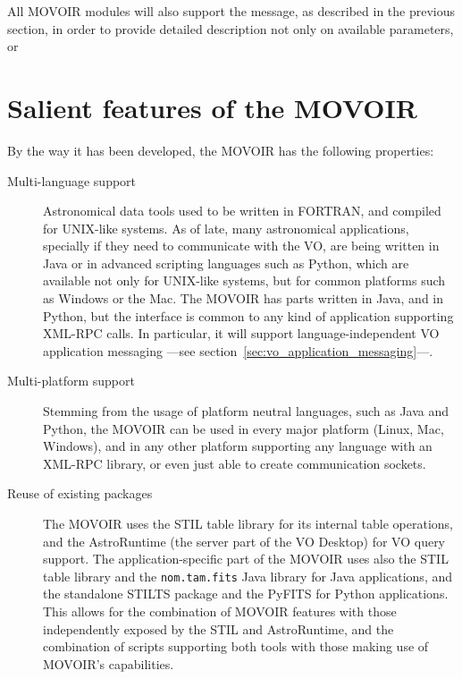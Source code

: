 		All MOVOIR modules will also support the
		 message, as described in
		the previous section, in order to provide detailed 
		description not only on available parameters, or  
		
	
	\section{Salient features of the MOVOIR} %
	\label{sec:salient_movoir_features}
	
		By the way it has been developed, the MOVOIR has the
		following properties:
		
		\begin{description}
			\item[Multi-language support] Astronomical data tools
			used to be written in FORTRAN, and compiled for
			UNIX-like systems. As of late, many astronomical
			applications, specially if they need to communicate
			with the VO, are being written in Java or in advanced
			scripting languages such as Python, which are available
			not only for UNIX-like systems, but for common
			platforms such as Windows or the Mac. The MOVOIR has
			parts written in Java, and in Python, but the interface
			is common to any kind of application supporting XML-RPC
			calls. In particular, it will support
			language-independent VO application messaging ---see
			section~\ref{sec:vo_application_messaging}---.
			
			\item[Multi-platform support] Stemming from the usage
			of platform neutral languages, such as Java and Python,
			the MOVOIR can be used in every major platform
			(Linux, Mac, Windows), and in any other platform
			supporting any language with an XML-RPC library, or
			even just able to create communication sockets.
			
			\newcommand{\stilurl}[0]
			{http://www.star.bristol.ac.uk/~mbt/stil/} \item[Reuse
			of existing packages] The MOVOIR uses the STIL table
			library\urlnote{\stilurl} for its internal table
			operations, and the AstroRuntime (the server part of
			the VO Desktop) for VO query support. The
			application-specific part of the MOVOIR uses also the
			STIL table library and the
			\texttt{nom.tam.fits}\urlnote{\nomtamfitsurl} Java
			library for Java applications, and the standalone
			STILTS package\urlnote{\stiltsurl} and the
			PyFITS\urlnote{\pyfitsurl} for Python applications.
			This allows for the combination of MOVOIR features with
			those independently exposed by the STIL and
			AstroRuntime, and the combination of scripts supporting
			both tools with those making use of MOVOIR's
			capabilities.
			

\end{description}
